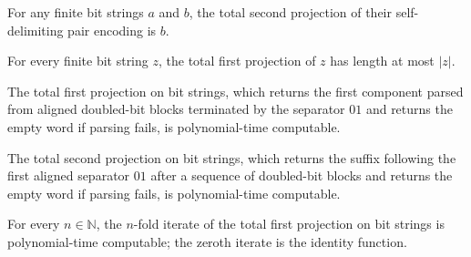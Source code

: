 \begin{theorem}
\label{Complexity.pairSndD_pairEncode}
\leanok
{}
For any finite bit strings $a$ and $b$, the total second projection of their
self-delimiting pair encoding is $b$.
\end{theorem}

\begin{theorem}
\label{Complexity.length_pairFstD_le}
\leanok
{}
For every finite bit string $z$, the total first projection of $z$ has length at most
$|z|$.
\end{theorem}

\begin{theorem}
\label{Complexity.polyTimeComputable_pairFstD}
\leanok
{}
The total first projection on bit strings, which returns the first component parsed from
aligned doubled-bit blocks terminated by the separator $01$ and returns the empty word
if parsing fails, is polynomial-time computable.
\end{theorem}

\begin{theorem}
\label{Complexity.polyTimeComputable_pairSndD}
\leanok
{}
The total second projection on bit strings, which returns the suffix following the first
aligned separator $01$ after a sequence of doubled-bit blocks and returns the empty word
if parsing fails, is polynomial-time computable.
\end{theorem}

\begin{theorem}
\label{Complexity.polyTimeComputable_iterate_pairFstD}
\leanok
{}
For every $n\in\mathbb{N}$, the $n$-fold iterate of the total first projection on bit
strings is polynomial-time computable; the zeroth iterate is the identity function.
\end{theorem}


